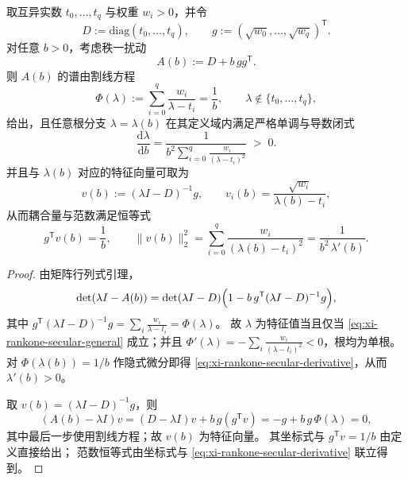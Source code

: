 \begin{proposition}\label{prop:xi-rankone-secular-monotonicity-derivative-norm}
取互异实数 \(t_0,\dots,t_q\) 与权重 \(w_i>0\)，并令
\[
D:=\mathrm{diag}(t_0,\dots,t_q),\qquad g:=(\sqrt{w_0},\dots,\sqrt{w_q})^{\mathsf T}.
\]
对任意 \(b>0\)，考虑秩一扰动
\[
A(b):=D+b\,gg^{\mathsf T}.
\]
则 \(A(b)\) 的谱由割线方程
\begin{equation}\label{eq:xi-rankone-secular-general}
\Phi(\lambda):=\sum_{i=0}^{q}\frac{w_i}{\lambda-t_i}=\frac1b,
\qquad
\lambda\notin\{t_0,\dots,t_q\},
\end{equation}
给出，且任意根分支 \(\lambda=\lambda(b)\) 在其定义域内满足严格单调与导数闭式
\begin{equation}\label{eq:xi-rankone-secular-derivative}
\frac{\mathrm d\lambda}{\mathrm db}
=\frac{1}{b^2\displaystyle\sum_{i=0}^{q}\frac{w_i}{(\lambda-t_i)^2}}
\;>\;0.
\end{equation}
并且与 \(\lambda(b)\) 对应的特征向量可取为
\[
v(b):=(\lambda I-D)^{-1}g,\qquad
v_i(b)=\frac{\sqrt{w_i}}{\lambda(b)-t_i},
\]
从而耦合量与范数满足恒等式
\[
g^{\mathsf T}v(b)=\frac1b,
\qquad
\|v(b)\|_2^2=\sum_{i=0}^{q}\frac{w_i}{(\lambda(b)-t_i)^2}=\frac{1}{b^2\,\lambda'(b)}.
\]
\end{proposition}
\begin{proof}
由矩阵行列式引理，
\[
\det(\lambda I-A(b))
=\det(\lambda I-D)\Bigl(1-b\,g^{\mathsf T}(\lambda I-D)^{-1}g\Bigr),
\]
其中
\(
g^{\mathsf T}(\lambda I-D)^{-1}g=\sum_i\frac{w_i}{\lambda-t_i}=\Phi(\lambda)
\)。
故 \(\lambda\) 为特征值当且仅当 \eqref{eq:xi-rankone-secular-general} 成立；并且 \(\Phi'(\lambda)=-\sum_i\frac{w_i}{(\lambda-t_i)^2}<0\)，根均为单根。
对 \(\Phi(\lambda(b))=1/b\) 作隐式微分即得 \eqref{eq:xi-rankone-secular-derivative}，从而 \(\lambda'(b)>0\)。
\par
取 \(v(b)=(\lambda I-D)^{-1}g\)，则
\[
(A(b)-\lambda I)v
=(D-\lambda I)v+b\,g(g^{\mathsf T}v)
=-g+b\,g\,\Phi(\lambda)
=0,
\]
其中最后一步使用割线方程；故 \(v(b)\) 为特征向量。
其坐标式与 \(g^{\mathsf T}v=1/b\) 由定义直接给出；
范数恒等式由坐标式与 \eqref{eq:xi-rankone-secular-derivative} 联立得到。
\end{proof}

